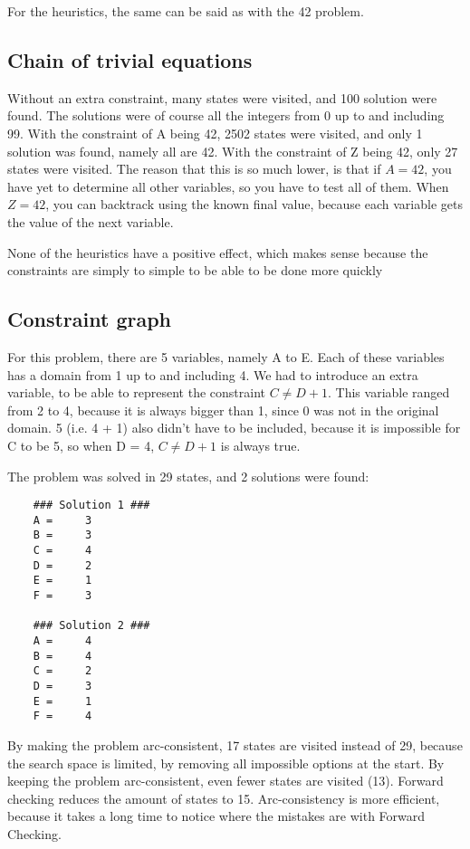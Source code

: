 \documentclass{article}
\begin{document}
	For the heuristics, the same can be said as with the 42 problem.
	
	\subsection*{Chain of trivial equations}
	
	Without an extra constraint, many states were visited, and 100 solution were found. The solutions were of course all the integers from 0 up to and including 99. With the constraint of A being 42, 2502 states were visited, and only 1 solution was found, namely all are 42. With the constraint of Z being 42, only 27 states were visited. The reason that this is so much lower, is that if $A = 42$, you have yet to determine all other variables, so you have to test all of them. When $Z = 42$, you can backtrack using the known final value, because each variable gets the value of the next variable. 
	
	None of the heuristics have a positive effect, which makes sense because the constraints are simply to simple to be able to be done more quickly
	
	\subsection*{Constraint graph}
	
	For this problem, there are 5 variables, namely A to E. Each of these variables has a domain from 1 up to and including 4. We had to introduce an extra variable, to be able to represent the constraint $ C \neq D + 1 $. This variable ranged from 2 to 4, because it is always bigger than 1, since 0 was not in the original domain. 5 (i.e. 4 + 1) also didn't have to be included, because it is impossible for C to be 5, so when D = 4, $ C \neq D + 1 $ is always true.
	
	The problem was solved in 29 states, and 2 solutions were found: 
	\begin{lstlisting}
	### Solution 1 ###
	A = 	3 
	B = 	3 
	C = 	4 
	D = 	2 
	E = 	1 
	F = 	3 

	### Solution 2 ###
	A = 	4 
	B = 	4 
	C = 	2 
	D = 	3 
	E = 	1 
	F = 	4 
\end{lstlisting}

	By making the problem arc-consistent, 17 states are visited instead of 29, because the search space is limited, by removing all impossible options at the start. By keeping the problem arc-consistent, even fewer states are visited (13). Forward checking reduces the amount of states to 15. Arc-consistency is more efficient, because it takes a long time to notice where the mistakes are with Forward Checking.
\end{document}
